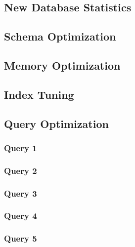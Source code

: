 \subsection{New Database Statistics}

\subsection{Schema Optimization}

\subsection{Memory Optimization}

\subsection{Index Tuning}

\subsection{Query Optimization}
\subsubsection{Query 1}
\subsubsection{Query 2}
\subsubsection{Query 3}
\subsubsection{Query 4}
\subsubsection{Query 5}
